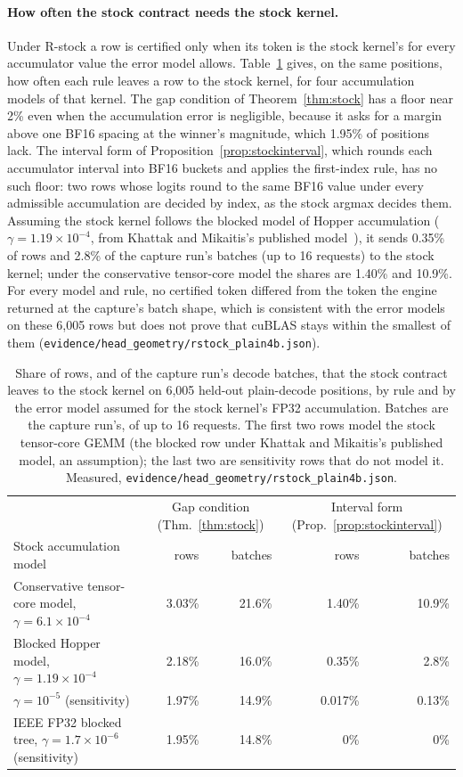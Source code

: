 \paragraph{How often the stock contract needs the stock kernel.} Under R-stock a row is certified only when its token is the stock kernel's for every accumulator value the error model allows. Table~\ref{tab:rstock} gives, on the same positions, how often each rule leaves a row to the stock kernel, for four accumulation models of that kernel. The gap condition of Theorem~\ref{thm:stock} has a floor near 2\% even when the accumulation error is negligible, because it asks for a margin above one BF16 spacing at the winner's magnitude, which 1.95\% of positions lack. The interval form of Proposition~\ref{prop:stockinterval}, which rounds each accumulator interval into BF16 buckets and applies the first-index rule, has no such floor: two rows whose logits round to the same BF16 value under every admissible accumulation are decided by index, as the stock argmax decides them. Assuming the stock kernel follows the blocked model of Hopper accumulation ($\gamma=1.19\times10^{-4}$, from Khattak and Mikaitis's published model~\cite{khattak2026}), it sends 0.35\% of rows and 2.8\% of the capture run's batches (up to 16 requests) to the stock kernel; under the conservative tensor-core model the shares are 1.40\% and 10.9\%. For every model and rule, no certified token differed from the token the engine returned at the capture's batch shape, which is consistent with the error models on these 6,005 rows but does not prove that cuBLAS stays within the smallest of them (\nolinkurl{evidence/head_geometry/rstock_plain4b.json}).

\begin{table}[tbp]
\small\centering
\begin{tabular}{@{}lrrrr@{}}\toprule
& \multicolumn{2}{c}{Gap condition (Thm.~\ref{thm:stock})} & \multicolumn{2}{c}{Interval form (Prop.~\ref{prop:stockinterval})}\\
Stock accumulation model & rows & batches & rows & batches\\\midrule
Conservative tensor-core model, $\gamma=6.1\times10^{-4}$ & 3.03\% & 21.6\% & 1.40\% & 10.9\%\\
Blocked Hopper model, $\gamma=1.19\times10^{-4}$ & 2.18\% & 16.0\% & 0.35\% & 2.8\%\\
$\gamma=10^{-5}$ (sensitivity) & 1.97\% & 14.9\% & 0.017\% & 0.13\%\\
IEEE FP32 blocked tree, $\gamma=1.7\times10^{-6}$ (sensitivity) & 1.95\% & 14.8\% & 0\% & 0\%\\\bottomrule
\end{tabular}
\caption{Share of rows, and of the capture run's decode batches, that the stock contract leaves to the stock kernel on 6,005 held-out plain-decode positions, by rule and by the error model assumed for the stock kernel's FP32 accumulation. Batches are the capture run's, of up to 16 requests. The first two rows model the stock tensor-core GEMM (the blocked row under Khattak and Mikaitis's published model, an assumption); the last two are sensitivity rows that do not model it. Measured, \nolinkurl{evidence/head_geometry/rstock_plain4b.json}.}
\label{tab:rstock}
\end{table}

